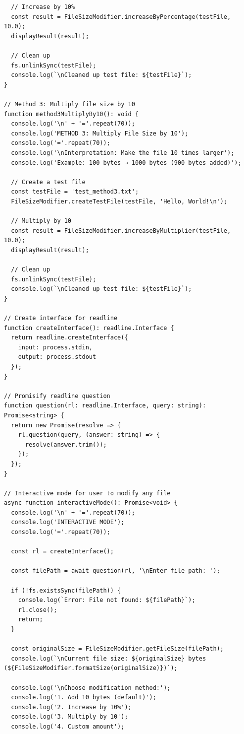 \documentclass[a4paper,12pt]{article}
\begin{document}
\begin{verbatim}
  // Increase by 10%
  const result = FileSizeModifier.increaseByPercentage(testFile, 10.0);
  displayResult(result);
  
  // Clean up
  fs.unlinkSync(testFile);
  console.log(`\nCleaned up test file: ${testFile}`);
}

// Method 3: Multiply file size by 10
function method3MultiplyBy10(): void {
  console.log('\n' + '='.repeat(70));
  console.log('METHOD 3: Multiply File Size by 10');
  console.log('='.repeat(70));
  console.log('\nInterpretation: Make the file 10 times larger');
  console.log('Example: 100 bytes → 1000 bytes (900 bytes added)');
  
  // Create a test file
  const testFile = 'test_method3.txt';
  FileSizeModifier.createTestFile(testFile, 'Hello, World!\n');
  
  // Multiply by 10
  const result = FileSizeModifier.increaseByMultiplier(testFile, 10.0);
  displayResult(result);
  
  // Clean up
  fs.unlinkSync(testFile);
  console.log(`\nCleaned up test file: ${testFile}`);
}

// Create interface for readline
function createInterface(): readline.Interface {
  return readline.createInterface({
    input: process.stdin,
    output: process.stdout
  });
}

// Promisify readline question
function question(rl: readline.Interface, query: string): Promise<string> {
  return new Promise(resolve => {
    rl.question(query, (answer: string) => {
      resolve(answer.trim());
    });
  });
}

// Interactive mode for user to modify any file
async function interactiveMode(): Promise<void> {
  console.log('\n' + '='.repeat(70));
  console.log('INTERACTIVE MODE');
  console.log('='.repeat(70));
  
  const rl = createInterface();
  
  const filePath = await question(rl, '\nEnter file path: ');
  
  if (!fs.existsSync(filePath)) {
    console.log(`Error: File not found: ${filePath}`);
    rl.close();
    return;
  }
  
  const originalSize = FileSizeModifier.getFileSize(filePath);
  console.log(`\nCurrent file size: ${originalSize} bytes (${FileSizeModifier.formatSize(originalSize)})`);
  
  console.log('\nChoose modification method:');
  console.log('1. Add 10 bytes (default)');
  console.log('2. Increase by 10%');
  console.log('3. Multiply by 10');
  console.log('4. Custom amount');
  

\end{verbatim}
\end{document}
